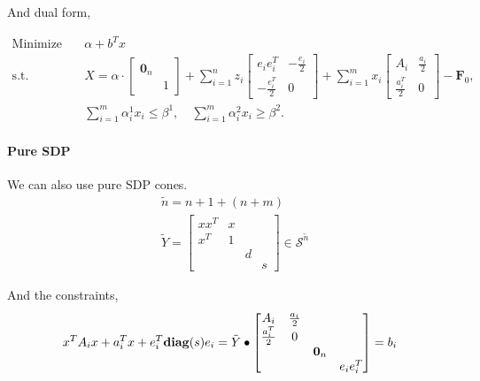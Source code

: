 \documentclass[../main]{subfiles}
\begin{document}
And dual form,

\begin{align*}
    \mathrm{Minimize} \quad & \alpha + b^Tx                                                                            \\
    \mathrm{s.t.} \quad     & X =\alpha \cdot \begin{bmatrix}  \bm 0_n &  \\  & 1  \end{bmatrix}
    + \sum_{i=1}^{n} z_{i} \begin{bmatrix} e_ie_i^T  & -\frac{e_i}{2} \\ -\frac{e_i^T}{2} & 0  \end{bmatrix}
    + \sum_{i=1}^{m} x_{i} \begin{bmatrix} A_i  & \frac{a_i}{2} \\ \frac{a_i^T}{2} & 0 \end{bmatrix}
    - \boldsymbol{F}_{0},                                                                                                                      \\
                            & \sum_{i=1}^{m} \alpha_{i}^{1} x_{i} \leq \beta^{1}, \quad \sum_{i=1}^{m}  \alpha_{i}^{2} x_{i} \geq \beta^{2} .
\end{align*}



\paragraph{Pure SDP}
We can also use pure SDP cones.
\begin{equation}
    \begin{aligned}
         & \tilde n = n + 1 + (n + m)                                       \\
         & \tilde{Y} = \begin{bmatrix}
            xx^T & x &   &   \\
            x^T  & 1 &   &   \\
                 &   & d &   \\
                 &   &   & s
        \end{bmatrix}\in \mathscr S^{\tilde{n}}
    \end{aligned}
\end{equation}

And the constraints,
\begin{equation}
    x^TA_ix + a_i^Tx + e_i^T\mathbf{diag}(s)e_i = \tilde{Y} \bullet    \begin{bmatrix}
        A_i             & \frac{a_i}{2} &         &          \\
        \frac{a_i^T}{2} & 0             &         &          \\
                        &               & \bm 0_n &          \\
                        &               &         & e_ie_i^T
    \end{bmatrix} = b_i
\end{equation}
\end{document}

